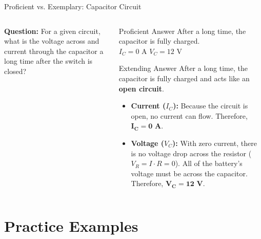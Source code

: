 \documentclass{beamer}
\begin{document}
\begin{frame}{Proficient vs. Exemplary: Capacitor Circuit}

\begin{columns}[T] %
    \begin{column}{0.3\textwidth}
        \textbf{Question:} For a given circuit, what is the voltage across and current through the capacitor a long time after the switch is closed?

    \end{column}
    \begin{column}{0.65\textwidth}
        \begin{block}{Proficient Answer}
            After a long time, the capacitor is fully charged. \\
            $I_C = 0$ A     $V_C = 12$ V
        \end{block}

       \begin{alertblock}{Extending Answer}
    After a long time, the capacitor is fully charged and acts like an \textbf{open circuit}.
    
    \begin{itemize}
        \item \textbf{Current ($I_C$):} Because the circuit is open, no current can flow. Therefore, $\mathbf{I_C = 0}$ \textbf{A}.
        
        \item \textbf{Voltage ($V_C$):} With zero current, there is no voltage drop across the resistor ($V_R = I \cdot R = 0$). All of the battery's voltage must be across the capacitor. Therefore, $\mathbf{V_C = 12}$ \textbf{V}.
    \end{itemize}
\end{alertblock}

    \end{column}
\end{columns}

\end{frame}

\section{Practice Examples}
\end{document}
